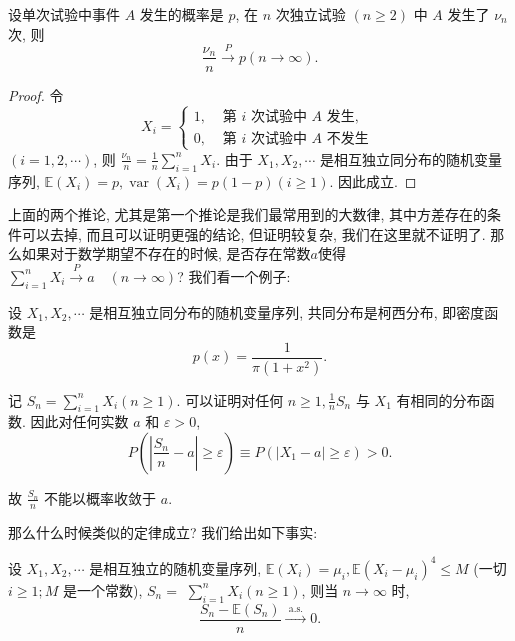 \begin{corollary}
    设单次试验中事件 $A$ 发生的概率是 $p$, 在 $n$ 次独立试验 $(n \geqslant 2)$ 中 $A$ 发生了 $\nu_n$ 次, 则
$$
\frac{\nu_n}{n} \stackrel{P}{\longrightarrow} p(n \rightarrow \infty) .
$$
\end{corollary}

\begin{proof}令
$$
X_i= \begin{cases}1, & \text { 第 } i \text { 次试验中 } A \text { 发生, } \\ 0, & \text { 第 } i \text { 次试验中 } A \text { 不发生 }\end{cases}
$$
$(i=1,2, \cdots)$, 则 $\frac{\nu_n}{n}=\frac{1}{n} \sum_{i=1}^n X_i$. 由于 $X_1, X_2, \cdots$ 是相互独立同分布的随机变量序列, $\mathbb{E}\left(X_i\right)=p, \operatorname{var}\left(X_i\right)=p(1-p)(i \geqslant 1)$. 因此成立.
\end{proof}

上面的两个推论, 尤其是第一个推论是我们最常用到的大数律, 其中方差存在的条件可以去掉, 而且可以证明更强的结论, 但证明较复杂, 我们在这里就不证明了. 那么如果对于数学期望不存在的时候, 是否存在常数$a$使得$\sum_{i=1}^n X_i \stackrel{P}{\longrightarrow} a \quad(n \rightarrow \infty)$? 我们看一个例子: 

\begin{example}
    设 $X_1, X_2, \cdots$ 是相互独立同分布的随机变量序列, 共同分布是柯西分布, 即密度函数是
$$
p(x)=\frac{1}{\pi\left(1+x^2\right)} .
$$

记 $S_n=\sum_{i=1}^n X_i(n \geqslant 1)$. 可以证明对任何 $n \geqslant 1, \frac{1}{n} S_n$ 与 $X_1$ 有相同的分布函数. 因此对任何实数 $a$ 和 $\varepsilon>0$,
$$
P\left(\left|\frac{S_n}{n}-a\right| \geqslant \varepsilon\right) \equiv P\left(\left|X_1-a\right| \geqslant \varepsilon\right)>0 .
$$

故 $\frac{S_n}{n}$ 不能以概率收敛于 $a$.
\end{example}

那么什么时候类似的定律成立? 我们给出如下事实: 

\begin{theorem}
      设 $X_1, X_2, \cdots$ 是相互独立的随机变量序列, $\mathbb{E}\left(X_i\right)=\mu_i, \mathbb{E}\left(X_i-\mu_i\right)^4 \leq M$ (一切 $i \geqslant 1 ; M$ 是一个常数), $S_n=$ $\sum_{i=1}^n X_i(n \geqslant 1)$, 则当 $n \rightarrow \infty$ 时,
$$
\frac{S_n-\mathbb{E}\left(S_n\right)}{n} \stackrel{\text { a.s. }}{\longrightarrow} 0 .
$$
\end{theorem}

